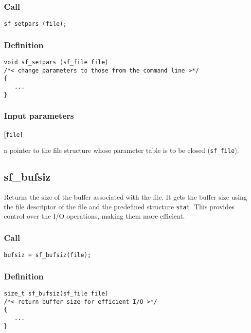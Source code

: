 \subsubsection*{Call}
\begin{verbatim}sf_setpars (file);\end{verbatim}

\subsubsection*{Definition}
\begin{verbatim}
void sf_setpars (sf_file file)
/*< change parameters to those from the command line >*/
{
   ...
}
\end{verbatim}

\subsubsection*{Input parameters}
\begin{desclist}{\tt }{\quad}[\tt file]
   \setlength\itemsep{0pt}
   \item[file] a pointer to the file structure whose parameter table is to be closed (\texttt{sf\_file}).  
\end{desclist}




\subsection{{sf\_bufsiz}}
Returns the size of the buffer associated with the file. It gets the buffer size using the file descriptor of the file and the predefined structure \texttt{stat}. This provides control over the I/O operations, making them more efficient.

\subsubsection*{Call}
\begin{verbatim}bufsiz = sf_bufsiz(file);\end{verbatim}

\subsubsection*{Definition}
\begin{verbatim}
size_t sf_bufsiz(sf_file file)
/*< return buffer size for efficient I/O >*/
{
   ...    
}       
\end{verbatim}


